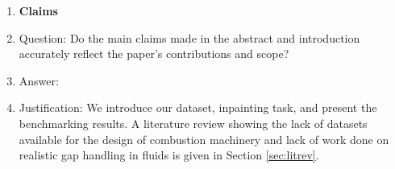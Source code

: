 \documentclass{article}
\begin{document}

\begin{enumerate}

\item {\bf Claims}
    \item[] Question: Do the main claims made in the abstract and introduction accurately reflect the paper's contributions and scope?
    \item[] Answer: 
    \answerYes{} 
    \item[] Justification: We introduce our dataset, inpainting task, and present the benchmarking results. A literature review showing the lack of datasets available for the design of combustion machinery and lack of work done on realistic gap handling in fluids is given in Section \ref{sec:litrev}.


\end{enumerate}
\end{document}
